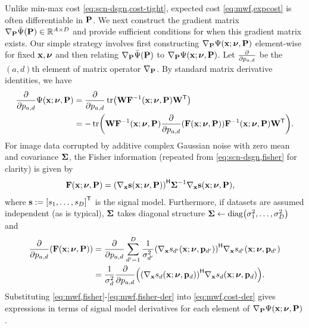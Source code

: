Unlike min-max cost \eqref{eq:scn-dsgn,cost-tight},
expected cost \eqref{eq:mwf,expcost} is often differentiable in $\mathbf{P}$.
We next construct the gradient matrix 
$\grada{\bmP}{\expcost\paren{\bmP}} \in \reals{A \times D}$
and provide sufficient conditions
for when this gradient matrix exists.
Our simple strategy involves 
first constructing $\grada{\bmP}{\costa{\bmx; \bmnu, \bmP}}$
element-wise 
for fixed $\mathbf{x},\boldsymbol{\nu}$
and then relating
$\grada{\bmP}{\expcost\paren{\bmP}}$
to $\grada{\bmP}{\costa{\bmx; \bmnu, \bmP}}$.
Let $\frac{\partial}{\partial p_{a,d}}$ be the $(a,d)$th element
of matrix operator $\nabla_{\mathbf{P}}$.
By standard matrix derivative identities,
we have
\begin{align}
	\dela{p_{a,d}} \costa{\bmx; \bmnu, \bmP}
		&= 
		\dela{p_{a,d}} \trace{\bmW \bmF^{-1}\paren{\bmx;\bmnu,\bmP} \bmW\tpose}
		\nonumber \\
		&= -\trace{\bmW \bmF^{-1}\paren{\bmx;\bmnu,\bmP} 
		\dela{p_{a,d}}\paren{\Fisher{\bmx;\bmnu,\bmP}} 
		\bmF^{-1}\paren{\bmx;\bmnu,\bmP} \bmW\tpose}.
		\label{eq:mwf,cost-der}
\end{align}
For image data corrupted
by additive complex Gaussian noise 
with zero mean 
and covariance $\boldsymbol{\Sigma}$,
the Fisher information
(repeated from \eqref{eq:scn-dsgn,fisher} for clarity)
is given by
\begin{align}
	\Fisher{\bmx; \bmnu, \bmP}
		&=
		\paren{\grada{\bmx} \bms\paren{\bmx; \bmnu, \bmP}}\ctpose
    \bmSig^{-1} \grada{\bmx} \bms\paren{\bmx; \bmnu, \bmP},
   \label{eq:mwf,fisher}
\end{align}
where $\bms := \brac{s_1,\dots,s_D}\tpose$ 
is the signal model.
Furthermore, if datasets are assumed independent
(as is typical),
$\boldsymbol{\Sigma}$ takes diagonal structure
$\bmSig \gets \diag{\sigma_1^2,\dots,\sigma_D^2}$
and
\begin{align}
	\dela{p_{a,d}}\paren{\Fisher{\bmx;\bmnu,\bmP}} 
		&= 
		\dela{p_{a,d}} \sum_{d'=1}^D \frac{1}{\sigma_{d'}^2}
		\paren{\grada{\bmx}{s_{d'}\paren{\bmx; \bmnu, \bmp_{d'}}}}\ctpose
		\grada{\bmx}{s_{d'}\paren{\bmx; \bmnu, \bmp_{d'}}}
		\nonumber \\
		&= 
		\frac{1}{\sigma_d^2} \dela{p_{a,d}} 
		\paren{\paren{\grada{\bmx}{s_d\paren{\bmx; \bmnu, \bmp_d}}}\ctpose
		\grada{\bmx}{s_d\paren{\bmx; \bmnu, \bmp_d}}}.
		\label{eq:mwf,fisher-der}
\end{align}
Substituting \eqref{eq:mwf,fisher}-\eqref{eq:mwf,fisher-der}
into \eqref{eq:mwf,cost-der} 
gives expressions 
in terms of signal model derivatives
for each element 
of $\grada{\bmP}{\costa{\bmx; \bmnu, \bmP}}$.
